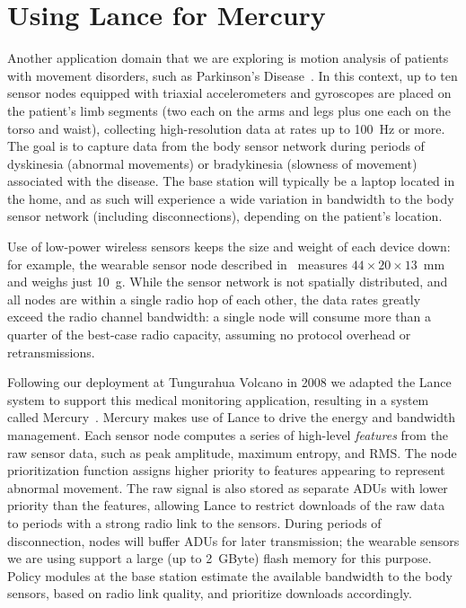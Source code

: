 \section{Using Lance for Mercury}


Another application domain that we are exploring is motion analysis of
patients with movement disorders, such as Parkinson's
Disease~\cite{parkinsons-embs07}. In this context, up to ten sensor nodes
equipped with triaxial accelerometers and gyroscopes are placed on the
patient's limb segments (two each on the arms and legs plus one each on the
torso and waist), collecting high-resolution data at rates up to 100~Hz or
more. The goal is to capture data from the body sensor network during periods
of dyskinesia (abnormal movements) or bradykinesia (slowness of movement)
associated with the disease. The base station will typically be a laptop
located in the home, and as such will experience a wide variation in
bandwidth to the body sensor network (including disconnections), depending on
the patient's location.

Use of low-power wireless sensors keeps the size and weight of each device
down: for example, the wearable sensor node described
in~\cite{parkinsons-embs07} measures $44 \times 20 \times 13$~mm and weighs
just 10~g. While the sensor network is not spatially distributed, and all
nodes are within a single radio hop of each other, the data rates greatly
exceed the radio channel bandwidth: a single node will consume more than a
quarter of the best-case radio capacity, assuming no protocol overhead or
retransmissions.

Following our deployment at Tungurahua Volcano in 2008 we adapted the Lance
system to support this medical monitoring application, resulting in a system
called Mercury~\cite{mercury-sensys09}. Mercury makes use of Lance to drive
the energy and bandwidth management. Each sensor node computes a series of
high-level \textit{features} from the raw sensor data, such as peak
amplitude, maximum entropy, and RMS. The node prioritization function assigns
higher priority to features appearing to represent abnormal movement. The raw
signal is also stored as separate ADUs with lower priority than the features,
allowing Lance to restrict downloads of the raw data to periods with a strong
radio link to the sensors. During periods of disconnection, nodes will buffer
ADUs for later transmission; the wearable sensors we are using support a
large (up to 2~GByte) flash memory for this purpose. Policy modules at the
base station estimate the available bandwidth to the body sensors, based on
radio link quality, and prioritize downloads accordingly.

